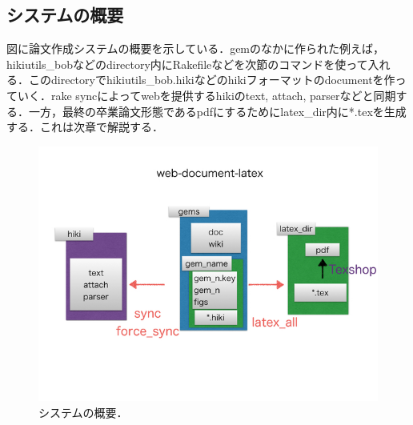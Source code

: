 \subsection{システムの概要}
図に論文作成システムの概要を示している．gemのなかに作られた例えば，hikiutils\_bobなどのdirectory内にRakefileなどを次節のコマンドを使って入れる．このdirectoryでhikiutils\_bob.hikiなどのhikiフォーマットのdocumentを作っていく．rake syncによってwebを提供するhikiのtext, attach, parserなどと同期する．一方，最終の卒業論文形態であるpdfにするためにlatex\_dir内に*.texを生成する．これは次章で解説する．

\begin{figure}[htbp]\begin{center}
\includegraphics[width=12cm,bb= 0 0 737 553]{../figs/./hikiutils_bob.004.jpeg}
\caption{システムの概要．}
\label{default}\end{center}\end{figure}
